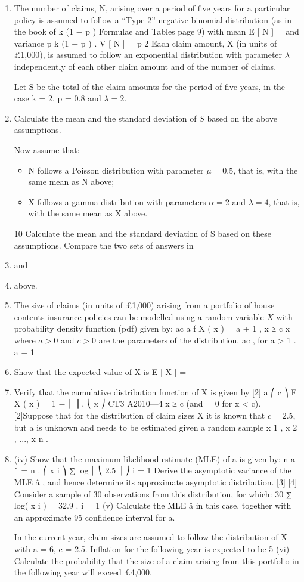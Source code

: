 \documentclass[a4paper,12pt]{article}
\begin{document}
\begin{enumerate}
\item The number of claims, N, arising over a period of five years for a particular policy is assumed to follow a “Type 2” negative binomial distribution (as in the book of
k (1 − p )
Formulae and Tables page 9) with mean E [ N ] =
and variance
p
k (1 − p )
.
V [ N ] =
p 2
Each claim amount, X (in units of £1,000), is assumed to follow an exponential distribution with parameter $\lambda$ independently of each other claim amount and of the number of claims.

Let S be the total of the claim amounts for the period of five years, in the case
k = 2, p = 0.8 and $\lambda=2$.
\item 
Calculate the mean and the standard deviation of $S$ based on the above assumptions.

Now assume that:
\begin{itemize}
\item  N follows a Poisson distribution with parameter $\mu = 0.5$, that is, with the same mean as N above;
\item  X follows a gamma distribution with parameters $\alpha = 2$ and $\lambda = 4$, that is, with the same mean as X above.
\end{itemize}

10
Calculate the mean and the standard deviation of S based on these
assumptions.
Compare the two sets of answers in \item  and \item  above.
\item The size of claims (in units of £1,000) arising from a portfolio of house contents
insurance policies can be modelled using a random variable $X$ with probability density
function (pdf) given by:
ac a
f X ( x ) = a + 1 , x ≥ c
x
where $a > 0$ and $c > 0$ are the parameters of the distribution.
ac
, for a > 1 .
a − 1
\item  Show that the expected value of X is E [ X ] =
\item  Verify that the cumulative distribution function of X is given by
[2]
a
⎛ c ⎞
F X ( x ) = 1 − ⎜ ⎟ ,
⎝ x ⎠
CT3 A2010—4
x ≥ c
(and = 0 for x < c).
[2]Suppose that for the distribution of claim sizes X it is known that $c = 2.5$, but a is
unknown and needs to be estimated given a random sample x 1 , x 2 , ..., x n .
\item 
(iv)
Show that the maximum likelihood estimate (MLE) of a is given by:
n
a ˆ = n
.
⎛ x i ⎞
∑ log ⎜ ⎝ 2.5 ⎟ ⎠
i = 1
Derive the asymptotic variance of the MLE â , and hence determine its
approximate asymptotic distribution.
[3]
[4]
Consider a sample of 30 observations from this distribution, for which:
30
∑ log( x i ) = 32.9 .
i = 1
(v)
Calculate the MLE â in this case, together with an approximate 95%
confidence interval for a.

In the current year, claim sizes are assumed to follow the distribution of X with a = 6,
c = 2.5. Inflation for the following year is expected to be 5%
(vi)
Calculate the probability that the size of a claim arising from this portfolio in
the following year will exceed £4,000.
\end{enumerate}
\end{document}
